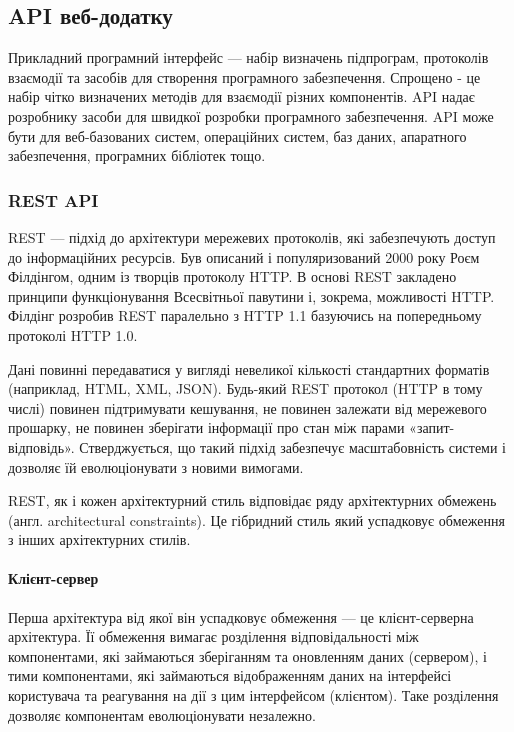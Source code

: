 \subsection{API веб-додатку}

Прикладний програмний інтерфейс — набір визначень підпрограм, протоколів взаємодії та засобів для створення програмного забезпечення. Спрощено - це набір чітко визначених методів для взаємодії різних компонентів. API надає розробнику засоби для швидкої розробки програмного забезпечення. API може бути для веб-базованих систем, операційних систем, баз даних, апаратного забезпечення, програмних бібліотек тощо.

\subsubsection{REST API}

REST — підхід до архітектури мережевих протоколів, які забезпечують доступ до інформаційних ресурсів. Був описаний і популяризований 2000 року Роєм Філдінгом, одним із творців протоколу HTTP. В основі REST закладено принципи функціонування Всесвітньої павутини і, зокрема, можливості HTTP. Філдінг розробив REST паралельно з HTTP 1.1 базуючись на попередньому протоколі HTTP 1.0.

Дані повинні передаватися у вигляді невеликої кількості стандартних форматів (наприклад, HTML, XML, JSON). Будь-який REST протокол (HTTP в тому числі) повинен підтримувати кешування, не повинен залежати від мережевого прошарку, не повинен зберігати інформації про стан між парами «запит-відповідь». Стверджується, що такий підхід забезпечує масштабовність системи і дозволяє їй еволюціонувати з новими вимогами.

REST, як і кожен архітектурний стиль відповідає ряду архітектурних обмежень (англ. architectural constraints). Це гібридний стиль який успадковує обмеження з інших архітектурних стилів.

\paragraph{Клієнт-сервер}

Перша архітектура від якої він успадковує обмеження — це клієнт-серверна архітектура. Її обмеження вимагає розділення відповідальності між компонентами, які займаються зберіганням та оновленням даних (сервером), і тими компонентами, які займаються відображенням даних на інтерфейсі користувача та реагування на дії з цим інтерфейсом (клієнтом). Таке розділення дозволяє компонентам еволюціонувати незалежно.

